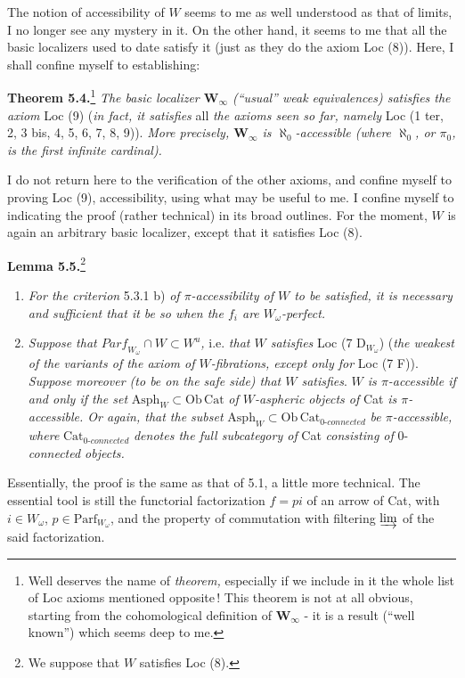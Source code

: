 \documentclass[11pt]{article}
\newcommand{\printedpage}[1]{\marginpar{\footnotesize p.~#1}}
\newcommand{\msp}[1]{\marginpar{\footnotesize [#1]}}
\newcommand{\Parf}{\mathrm{Parf}}
\begin{document}
The notion of accessibility of $W$ seems to me as well understood as that of limits, I no longer see any mystery in it. On the other hand, it seems to me that all the basic localizers used to date satisfy it (just as they do the axiom Loc (8)). Here, I shall confine myself to establishing:

\printedpage{43}

\textbf{Theorem 5.4.}\footnote[39]{Well deserves the name of \textit{theorem,} especially if we include in it the whole list of Loc axioms mentioned opposite\,! This theorem is not at all obvious, starting from the cohomological definition of $\mathbf{W}_\infty$ - it is a result (``well known'') which seems deep to me.} \textit{The basic localizer $\mathbf{W}_\infty$ (``usual'' weak equivalences) satisfies the axiom} Loc (9) (\textit{in fact, it satisfies} all \textit{the axioms seen so far, namely} Loc (1 ter, 2, 3 bis, 4, 5, 6, 7, 8, 9)). \textit{More precisely, $\mathbf{W}_\infty$ is $\aleph_0$-accessible (where $\aleph_0$, or $\pi_0$, is the first infinite cardinal).} %

I do not return here to the verification of the other axioms, and confine myself to proving Loc (9), accessibility, using what may be useful to me. I
\msp{page 80}
confine myself to indicating the proof (rather technical) in its broad outlines. For the moment, $W$ is again an arbitrary basic localizer, except that it satisfies Loc (8).

\textbf{Lemma 5.5.}\footnote[40]{We suppose that $W$ satisfies Loc (8).}
\begin{enumerate}[label={}]
\item[a)] \textit{For the criterion} 5.3.1 b) \textit{of $\pi$-accessibility of $W$ to be satisfied, it is necessary and sufficient that it be so when the $f_i$ are $W_\omega$-perfect.}
\item[b)] \textit{Suppose that $\mathit{Parf}_{W_\omega} \cap W \subset W^u$,} i.e. \textit{that $W$ satisfies} Loc (7 $\mathrm{D}_{W_\omega}$) (\textit{the weakest of the variants of the axiom of $W$-fibrations, except only for} Loc (7 F)). \textit{Suppose moreover (to be on the safe side) that $W$ satisfies}. \textit{$W$ is $\pi$-accessible if and only if the set} $\mathrm{Asph}_W \subset \mathrm{Ob}\,\mathrm{Cat}$ \textit{of $W$-aspheric objects of} Cat \textit{is $\pi$-accessible. Or again, that the subset} $\mathrm{Asph}_W \subset \mathrm{Ob}\,\mathrm{Cat}_{\textit{0-connected}}$ \textit{be $\pi$-accessible, where} $\mathrm{Cat}_{\textit{0-connected}}$ \textit{denotes the full subcategory of} Cat \textit{consisting of} 0-\textit{connected objects.}
\end{enumerate}
Essentially, the proof is the same as that of 5.1, a little more technical. The essential tool is still the functorial factorization $f = pi$ of an arrow of Cat, with $i \in W_\omega$, $p \in \Parf_{W_\omega}$, and the property of
\msp{page 81}
commutation with filtering $\varinjlim$ of the said factorization.
\end{document}
